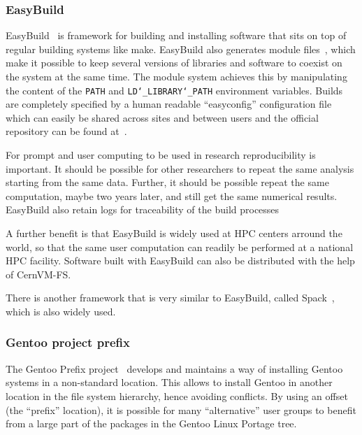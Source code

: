 \documentclass[12pt,a4paper]{article}
\begin{document}
\subsubsection{EasyBuild} \label{ssec:easybuild}

EasyBuild~\cite{easybuild} is framework for building and installing software that sits on top of regular building systems like make. 
EasyBuild also generates module files~\cite{lmod}, which make it possible to keep several versions of libraries and software to coexist on the system at the same time. 
The module system achieves this by manipulating the content of the \texttt{PATH} and {\tt{LD\char`_LIBRARY\char`_PATH}} environment variables. %
Builds are completely specified by a human readable ``easyconfig'' configuration file which can easily be shared across sites and between users and the official repository can be found at~\cite{easybuild-repo}.

For prompt and user computing to be used in research reproducibility is important. It should be possible for other researchers to repeat the same analysis starting from the same data. Further, it should be possible repeat the same computation, maybe two years later, and still get the same numerical results.
EasyBuild also retain logs for traceability of the build processes

A further benefit is that EasyBuild is widely used at HPC centers arround the world, so that the same user computation can readily be performed at a national HPC facility. 
Software built with EasyBuild can also be distributed with the help of CernVM-FS.

There is another framework that is very similar to EasyBuild, called Spack~\cite{spack}, which is also widely used.

\subsubsection{Gentoo project prefix} \label{ssec:gentoo}

The Gentoo Prefix project~\cite{gentoo-prefix} develops and maintains a way of installing Gentoo systems in a non-standard location.
This allows to install Gentoo in another location in the file system hierarchy, hence avoiding conflicts.
By using an offset (the ``prefix'' location), it is possible for many ``alternative'' user groups to benefit from a large part of the packages in the Gentoo Linux Portage tree. 
\end{document}
